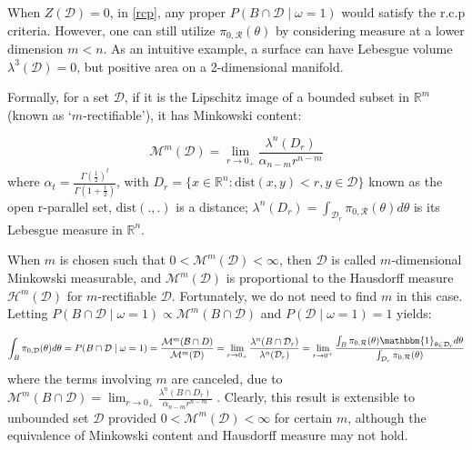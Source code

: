 \documentclass[10pt]{article}
\newcommand{\mc}[1]{\mathcal{#1}}
\DeclareMathOperator{\1}{\mathbbm{1}}
\begin{document}
When $Z(\mc D)=0$, in \eqref{rcp}, any proper ${P({B\cap  \mc D} \mid \omega=1)}$ would satisfy the r.c.p criteria. However, one can still utilize $\pi_{0,\mc R}(\theta)$ by considering measure at a lower dimension $m<n$. As an intuitive example, a surface can have Lebesgue volume $\lambda^3(\mc D)=0$, but positive area on a 2-dimensional manifold.

Formally, for a set $\mc D$, if it is the Lipschitz image of a bounded subset in $\mathbb R^m$ (known as `$m$-rectifiable'), it has Minkowski content:

\begin{equation}
\label{minkowski}
	\mc M^m(\mc D)=\lim_{r\rightarrow 0_+}\frac{\lambda^n(D_r)}{\alpha_{n-m} r^{n-m}}
\end{equation}
where $\alpha_t=\frac{\Gamma(\frac{1}{2})^{t}}{\Gamma(1+ \frac{t}{2})}$, with $D_r=\{x\in \mathbb{R}^n: \text{dist}(x,y)<r, y\in \mc D\}$ known as the open r-parallel set, $\text{dist}(.,.)$ is a distance; $\lambda^n(D_r)={ \int_{\mc D_r} \pi_{0,\mc R}(\theta)}d\theta$ is its Lebesgue measure in $\mathbb{R}^n$.


When $m$ is chosen such that $0<\mc M^m(\mc D)<\infty$, then $\mc D$ is called $m$-dimensional Minkowski measurable, and $\mc M^m(\mc D)$ is proportional to the Hausdorff measure $\mc H^{m}(\mc D)$ for $m$-rectifiable $\mc D$. Fortunately, we do not need to find $m$ in this case.
Letting $P({B\cap  \mc D} \mid \omega=1)\propto \mc M^m(B\cap\mc D)$ and $P({\mc D} \mid \omega=1)=1$ yields:

\begin{equation}
\label{exact_prior2}
	\int_{B} \pi_{0,\mc D}(\theta) d\theta= P({B\cap  \mc D} \mid \omega=1)= \frac{\mc M^m(\mc B\cap D)}{\mc M^m(\mc D)}= \lim_{r\rightarrow 0_+}\frac{\lambda^n(B\cap \mc D_r)}{\lambda^n(\mc D_r)} 
=\lim_{r\rightarrow 0^+} \frac{\int_{ B} \pi_{0,\mc R}(\theta) \mathbbm{1}_{\theta\in \mc D_r} d\theta}{ \int_{\mc D_r} \pi_{0,\mc R}(\theta)}
\end{equation}
where the terms involving $m$ are canceled, due to $\mc M^m(B\cap\mc D)=\lim_{r\rightarrow 0_+}\frac{\lambda^n(B\cap D_r)}{\alpha_{n-m} r^{n-m}}$ \citep{winter2016localization}. Clearly, this result is extensible to unbounded set $\mc D$ provided $0<\mc M^m(\mc D)<\infty$ for certain $m$, although the equivalence of Minkowski content and Hausdorff measure may not hold.
\end{document}
